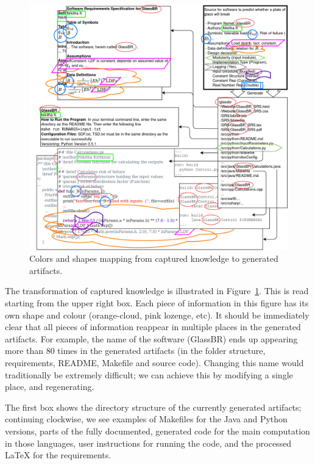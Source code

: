 \documentclass[a4paper,UKenglish,cleveref,autoref,thm-restate]{oasics-v2021}
\begin{document}
\begin{figure}[t]
  \centering
  \includegraphics[width=\linewidth]{assets/DrasilSupportsChange-right-portrait-overlapped-ungrouped-11ptFont-squished-blind-v1-300dpi.png}
  \caption{Colors and shapes mapping from captured knowledge to generated
  artifacts.}
  \label{Fig_DrasilAndChange}
\end{figure}

The transformation of captured knowledge is illustrated in
Figure~\ref{Fig_DrasilAndChange}. This is read starting from the upper right
box. Each piece of information in this figure has its own shape and colour
(orange-cloud, pink lozenge, etc). It should be immediately clear that all
pieces of information reappear in multiple places in the generated artifacts.
For example, the name of the software (GlassBR) ends up appearing more than 80
times in the generated artifacts (in the folder structure, requirements, README,
Makefile and source code). Changing this name would traditionally be extremely
difficult; we can achieve this by modifying a single place, and regenerating.

The first box shows the directory structure of the currently generated
artifacts; continuing clockwise, we see examples of Makefiles for the Java and
Python versions, parts of the fully documented, generated code for the main
computation in those languages, user instructions for running the code, and the
processed \LaTeX{} for the requirements.
\end{document}
